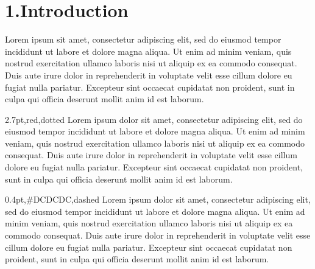 \documentclass{book}
\newcommand\GFbox{%
  \collectbox*[\color{green}]{\fbox}%
}
\begin{document}
 
\section*{1.\enskip{}Introduction}
 
\GFbox{Lorem ipsum}  sit amet, consectetur adipiscing elit, sed do eiusmod tempor incididunt ut labore et dolore magna aliqua. Ut enim ad minim veniam, quis nostrud exercitation ullamco laboris nisi ut aliquip ex ea commodo consequat. Duis aute irure dolor in reprehenderit in voluptate velit esse cillum dolore eu fugiat nulla pariatur. Excepteur sint occaecat cupidatat non proident, sunt in culpa qui officia deserunt mollit anim id est laborum.

\begin{mdxborder}{2.7pt,red,dotted}%
Lorem ipsum dolor sit amet, consectetur adipiscing elit, sed do eiusmod tempor incididunt ut labore et dolore magna aliqua. Ut enim ad minim veniam, quis nostrud
exercitation ullamco laboris nisi ut aliquip ex ea commodo consequat. Duis aute irure dolor in reprehenderit in voluptate velit esse cillum dolore eu fugiat nulla pariatur. Excepteur sint occaecat cupidatat non proident, sunt in culpa qui officia deserunt mollit anim id est laborum.
\end{mdxborder}%

\begin{mdxborder}{0.4pt,\#DCDCDC,dashed}
Lorem ipsum dolor sit amet, consectetur adipiscing elit, sed do eiusmod tempor incididunt ut labore et dolore magna aliqua. Ut enim ad minim veniam, quis nostrud
exercitation ullamco laboris nisi ut aliquip ex ea commodo consequat. Duis aute irure dolor in reprehenderit in voluptate velit esse cillum dolore eu fugiat nulla pariatur. Excepteur sint occaecat cupidatat non proident, sunt in culpa qui officia deserunt mollit anim id est laborum.
\end{mdxborder}
 
\end{document}
